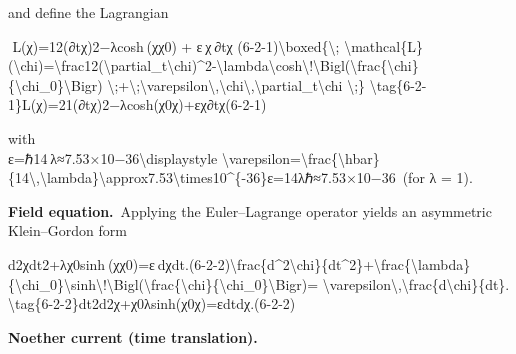 \documentclass[
]{article}
\begin{document}
and define the Lagrangian

  L(χ)=12(∂tχ)2−λcosh⁡ ⁣(χχ0)  +  ε χ ∂tχ  (6-2-1)\textbackslash boxed\{\textbackslash;
\textbackslash mathcal\{L\}(\textbackslash chi)=\textbackslash frac12(\textbackslash partial\_t\textbackslash chi)\^{}2-\textbackslash lambda\textbackslash cosh\textbackslash!\textbackslash Bigl(\textbackslash frac\{\textbackslash chi\}\{\textbackslash chi\_0\}\textbackslash Bigr)
\textbackslash;+\textbackslash;\textbackslash varepsilon\textbackslash,\textbackslash chi\textbackslash,\textbackslash partial\_t\textbackslash chi
\textbackslash;\}
\textbackslash tag\{6-2-1\}L(χ)=21\hspace{0pt}(∂t\hspace{0pt}χ)2−λcosh(χ0\hspace{0pt}χ\hspace{0pt})+εχ∂t\hspace{0pt}χ\hspace{0pt}(6-2-1)

with\\
ε=ℏ14 λ≈7.53×10−36\textbackslash displaystyle
\textbackslash varepsilon=\textbackslash frac\{\textbackslash hbar\}\{14\textbackslash,\textbackslash lambda\}\textbackslash approx7.53\textbackslash times10\^{}\{-36\}ε=14λℏ\hspace{0pt}≈7.53×10−36 (for
λ = 1).

\textbf{Field equation.} Applying the Euler--Lagrange operator yields an
asymmetric Klein--Gordon form

d2χdt2+λχ0sinh⁡ ⁣(χχ0)=ε dχdt.(6-2-2)\textbackslash frac\{d\^{}2\textbackslash chi\}\{dt\^{}2\}+\textbackslash frac\{\textbackslash lambda\}\{\textbackslash chi\_0\}\textbackslash sinh\textbackslash!\textbackslash Bigl(\textbackslash frac\{\textbackslash chi\}\{\textbackslash chi\_0\}\textbackslash Bigr)=
\textbackslash varepsilon\textbackslash,\textbackslash frac\{d\textbackslash chi\}\{dt\}.
\textbackslash tag\{6-2-2\}dt2d2χ\hspace{0pt}+χ0\hspace{0pt}λ\hspace{0pt}sinh(χ0\hspace{0pt}χ\hspace{0pt})=εdtdχ\hspace{0pt}.(6-2-2)

\textbf{Noether current (time translation).}
\end{document}
